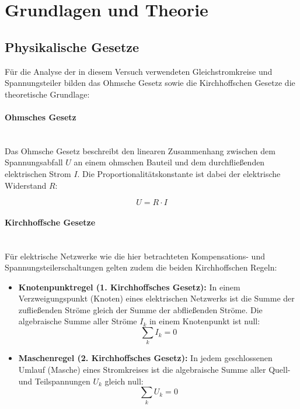 \documentclass[12pt,a4paper,titlepage]{scrartcl}
\numberwithin{equation}{section}
\numberwithin{table}{section}
\numberwithin{figure}{section}
\begin{document}
\section{Grundlagen und Theorie}
\subsection{Physikalische Gesetze}
Für die Analyse der in diesem Versuch verwendeten Gleichstromkreise und Spannungsteiler bilden das Ohmsche Gesetz sowie die Kirchhoffschen
Gesetze die theoretische Grundlage:

\paragraph{Ohmsches Gesetz}\mbox{}\\
Das Ohmsche Gesetz beschreibt den linearen Zusammenhang zwischen dem Spannungsabfall $U$ an einem ohmschen Bauteil und dem durchfließenden
elektrischen Strom $I$. Die Proportionalitätskonstante ist dabei der elektrische Widerstand $R$:

\begin{equation}
    U = R \cdot I
\end{equation}

\paragraph{Kirchhoffsche Gesetze}\mbox{}\\
Für elektrische Netzwerke wie die hier betrachteten Kompensations- und Spannungsteilerschaltungen gelten zudem die beiden Kirchhoffschen Regeln:
\begin{itemize}
    \item \textbf{Knotenpunktregel (1. Kirchhoffsches Gesetz):} In einem Verzweigungspunkt (Knoten) eines elektrischen Netzwerks ist die Summe der zufließenden Ströme gleich der Summe der abfließenden Ströme. Die algebraische Summe aller Ströme $I_k$ in einem Knotenpunkt ist null:
    \begin{equation}
        \sum_{k} I_k = 0
    \end{equation}
    \item \textbf{Maschenregel (2. Kirchhoffsches Gesetz):} In jedem geschlossenen Umlauf (Masche) eines Stromkreises ist die algebraische Summe aller Quell- und Teilspannungen $U_k$ gleich null:
    \begin{equation}
        \sum_{k} U_k = 0
    \end{equation}
\end{itemize}
\end{document}
